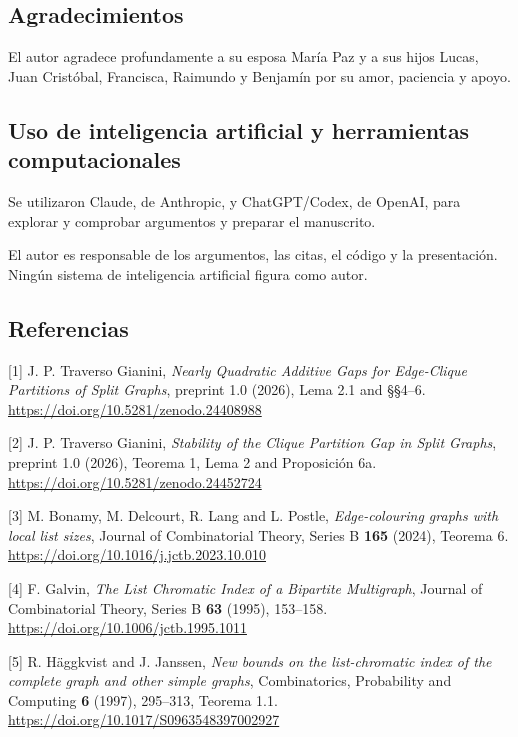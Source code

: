 \documentclass[spanish,11pt,a4paper]{article}
\begin{document}
\subsection{Agradecimientos}\label{agradecimientos}

El autor agradece profundamente a su esposa María Paz y a sus hijos Lucas, Juan Cristóbal, Francisca, Raimundo y Benjamín por su amor, paciencia y apoyo.

\subsection{Uso de inteligencia artificial y herramientas computacionales}\label{uso-de-inteligencia-artificial-y-herramientas-computacionales}

Se utilizaron Claude, de Anthropic, y ChatGPT/Codex, de OpenAI, para explorar y comprobar argumentos y preparar el manuscrito.

El autor es responsable de los argumentos, las citas, el código y la presentación. Ningún sistema de inteligencia artificial figura como autor.

\subsection{Referencias}\label{referencias}

{[}1{]} J. P. Traverso Gianini, \emph{Nearly Quadratic Additive Gaps for Edge-Clique Partitions of Split Graphs}, preprint 1.0 (2026), Lema 2.1 and §§4--6. \url{https://doi.org/10.5281/zenodo.24408988}

{[}2{]} J. P. Traverso Gianini, \emph{Stability of the Clique Partition Gap in Split Graphs}, preprint 1.0 (2026), Teorema 1, Lema 2 and Proposición 6a. \url{https://doi.org/10.5281/zenodo.24452724}

{[}3{]} M. Bonamy, M. Delcourt, R. Lang and L. Postle, \emph{Edge-colouring graphs with local list sizes}, Journal of Combinatorial Theory, Series B \textbf{165} (2024), Teorema 6. \url{https://doi.org/10.1016/j.jctb.2023.10.010}

{[}4{]} F. Galvin, \emph{The List Chromatic Index of a Bipartite Multigraph}, Journal of Combinatorial Theory, Series B \textbf{63} (1995), 153--158. \url{https://doi.org/10.1006/jctb.1995.1011}

{[}5{]} R. Häggkvist and J. Janssen, \emph{New bounds on the list-chromatic index of the complete graph and other simple graphs}, Combinatorics, Probability and Computing \textbf{6} (1997), 295--313, Teorema 1.1. \url{https://doi.org/10.1017/S0963548397002927}
\end{document}
